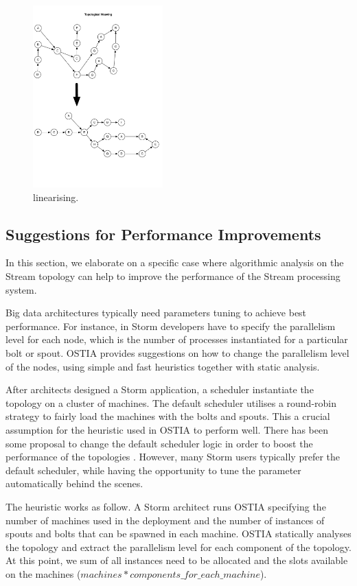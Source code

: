 \begin{figure}
	\begin{center}
		\includegraphics[width=5cm]{images/linearizing}
		\caption{linearising.}
		\label{fig:linearizing}
	\end{center}
\end{figure}

\subsection{Suggestions for Performance Improvements}
\label{sec:performance-boosting}
In this section, we elaborate on a specific case where algorithmic analysis on the Stream topology can help to improve the performance of the Stream processing system.

Big data architectures typically need parameters tuning to achieve best
performance. For instance, in Storm developers have to specify the parallelism
level for each node, which is the number of processes instantiated for a
particular bolt or spout. OSTIA provides suggestions on how to change the
parallelism level of the nodes, using simple and fast heuristics together with
static analysis.

After architects designed a Storm application, a scheduler instantiate the
topology on a cluster of machines. The default scheduler utilises a round-robin
strategy to fairly load the machines with the bolts and spouts. This a crucial
assumption for the heuristic used in OSTIA to perform well. There has been some
proposal to change the default scheduler logic in order to boost the performance
of the topologies \cite{Aniello2013Adaptive, R-Storm2015Peng}. However, many
Storm users typically prefer the default scheduler, while having the opportunity
to tune the parameter automatically behind the scenes.

The heuristic works as follow. A Storm architect runs OSTIA specifying the
number of machines used in the deployment and the number of instances of spouts
and bolts that can be spawned in each machine. OSTIA statically analyses the
topology and extract the parallelism level for each component of the
topology. At this point, we sum of all instances need to be allocated and the
slots available on the machines ($machines * components\_for\_each\_machine$).

